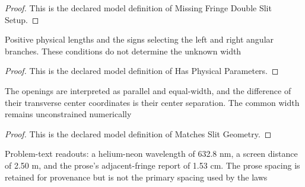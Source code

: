 \begin{proof}
  This is the declared model definition of Missing Fringe Double Slit Setup.
\end{proof}
\begin{definition}
  \label{def:physics:phyx-mini-0122:phyxminiproblems-problemphyxmini0122-hasphysicalparameters}
  Positive physical lengths and the signs selecting the left and right angular branches. These conditions do not determine the unknown width
\end{definition}
\begin{proof}
  This is the declared model definition of Has Physical Parameters.
\end{proof}
\begin{definition}
  \label{def:physics:phyx-mini-0122:phyxminiproblems-problemphyxmini0122-matchesslitgeometry}
  The openings are interpreted as parallel and equal-width, and the difference of their transverse center coordinates is their center separation. The common width remains unconstrained numerically
\end{definition}
\begin{proof}
  This is the declared model definition of Matches Slit Geometry.
\end{proof}
\begin{definition}
  \label{def:physics:phyx-mini-0122:phyxminiproblems-problemphyxmini0122-matchesproblemreadouts}
  Problem-text readouts: a helium-neon wavelength of 632.8 nm, a screen distance of 2.50 m, and the prose's adjacent-fringe report of 1.53 cm. The prose spacing is retained for provenance but is not the primary spacing used by the laws
\end{definition}
